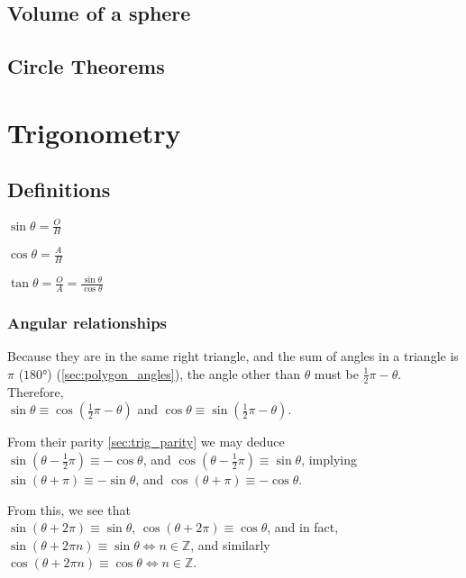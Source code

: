 \documentclass[a4paper,11pt]{article}
\begin{document}
    \subsection{Volume of a sphere}

    \subsection{Circle Theorems}

    \section{Trigonometry}

    \subsection{Definitions} \label{sec:trig_definitions}


    $\displaystyle\sin \theta = \frac OH$

    $\displaystyle\cos \theta = \frac AH$

    $\displaystyle\tan \theta = \frac OA = \frac{\sin \theta}{\cos \theta}$

    \subsubsection{Angular relationships} \label{sec:trig_periodic}


    Because they are in the same right triangle, and the sum of angles in a
    triangle is $\pi$ ($\ang{180}$) (\ref{sec:polygon_angles}), the angle other
    than $\theta$ must be $\frac 12 \pi - \theta$. Therefore,
    \\$\sin \theta \equiv \cos(\frac 12 \pi - \theta)$ and
    $\cos \theta \equiv \sin(\frac 12 \pi - \theta)$.

    From their parity \ref{sec:trig_parity} we may deduce
    \\$\sin(\theta - \frac 12 \pi) \equiv -\cos \theta$, and
    $\cos(\theta - \frac 12 \pi) \equiv \sin \theta$, implying
    \\$\sin(\theta + \pi) \equiv -\sin \theta$, and
    $\cos(\theta + \pi) \equiv -\cos \theta$.

    From this, we see that
    \\$\sin(\theta + 2\pi) \equiv \sin \theta$,
    $\cos(\theta + 2\pi) \equiv \cos \theta$, and in fact,
    \\$\sin(\theta + 2\pi n) \equiv \sin \theta \iff n \in \mathbb{Z}$,
    and similarly
    \\$\cos(\theta + 2\pi n) \equiv \cos \theta \iff n \in \mathbb{Z}$.
\end{document}
